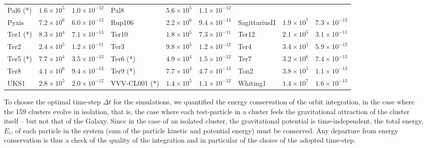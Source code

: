 \begin{table}
\begin{center}
\begin{tabular}{l | c | c | l |  c|   c | l | c | c }
                Pal6 (*) &  $1.6\times10^5$ &          $1.0\times10^{-12}$ &
                Pal8 &  $5.6\times10^5$ &          $1.1\times10^{-12}$  \\
                Pyxis &  $7.2\times10^6$ &          $6.0\times10^{-13}$  &
                Rup106 &  $2.2\times10^6 $&          $9.4\times10^{-13}$  &
        SagittariusII &  $1.9\times10^7$ &          $7.3\times10^{-13}$ \\
                Ter1 (*)&  $8.3\times10^4$ &          $7.1\times10^{-13}$  &
                Ter10 &  $1.8\times10^5 $&          $7.3\times10^{-11}$  &
                Ter12 &  $2.1\times10^5$ &          $3.1\times10^{-11}$ \\
                Ter2 &  $2.4\times10^5$ &          $1.2\times10^{-11}$  &
                Ter3 &  $9.8\times10^5$ &          $1.2\times10^{-12}$  &
                Ter4 &  $3.4\times10^5$ &          $5.9\times10^{-12}$ \\
                Ter5 (*) &  $7.7\times10^4$ &          $3.5\times10^{-13}$ &
                Ter6 (*) &  $4.9\times10^4$ &          $1.5\times10^{-12}$ &
                Ter7 &  $3.2\times10^6 $&         $ 7.4\times10^{-13}$  \\
                Ter8 &  $4.1\times10^6$ &          $9.4\times10^{-13}$ &
                Ter9 (*) &  $7.7\times10^4$ &          $4.7\times10^{-13}$  &
                Ton2 &  $3.8\times10^5 $&          $1.1\times10^{-13}$  \\
                UKS1 &  $2.8\times10^5 $&         $ 2.0\times10^{-12}$  &
            VVV-CL001 (*) &  $1.4\times10^5$ &       $   1.1\times10^{-12}$ &
            Whiting1 &  $1.4\times10^7$ &          $1.6\times10^{-13}$ \\ 
        \hline
        \end{tabular}
        \end{center}

        \end{table}
        
        To choose the optimal time-step $\Delta t$ for the simulations, we quantified the energy conservation of the orbit integration, in the case where the 159 clusters evolve in isolation, that is,  the case where each test-particle in a cluster feels the gravitational attraction of the cluster itself -- but not that of the Galaxy. Since in the case of an isolated cluster, the gravitational potential is time-independent, the total energy, $E_i$, of each particle in the system (sum of the particle kinetic and potential energy) must be conserved. Any departure from energy conservation is thus a check of the quality of the integration and in particular of the choice of the adopted time-step.


